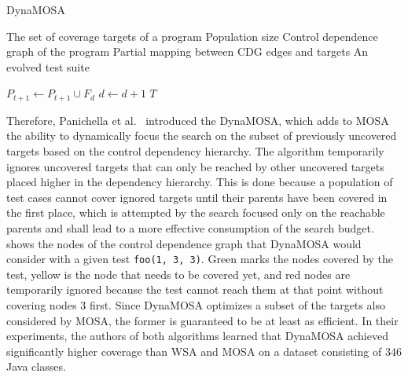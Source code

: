 \documentclass[paper=a4,%
  twoside,%
  BCOR4mm,%
  abstract=true,%
  toc=bibliography,%
  chapterprefix=true,%
  toc=bibliographynumbered,%
  open=right,%
  english,%
  pagesize=pdftex]{scrreprt}
\newcommand{\Desc}[2]{\State \makebox[2em][l]{#1}#2}
\begin{document}
\begin{algorithm}[]
  \caption{DynaMOSA~\cite{Panichella2018}}\label{alg:dynamosa}
  \begin{algorithmic}
  \Input
    \Desc{$U$}{The set of coverage targets of a program}
    \Desc{$M$}{Population size}
    \Desc{$G$}{Control dependence graph of the program}
    \Desc{$\phi$}{Partial mapping between CDG edges and targets}
    \EndInput
    \Output
    \Desc{$T$}{An evolved test suite}
    \EndOutput

          \State $P_{t + 1} \gets P_{t + 1} \cup F_d$
          \State $d \gets d + 1$
      \EndWhile
  \EndWhile
  \State \Return $T$
  \end{algorithmic}
  \end{algorithm}

Therefore, Panichella et al.~\cite{Panichella2018} introduced the \ac{DynaMOSA}, which adds to \ac{MOSA} the ability to dynamically focus the search on the subset of previously uncovered targets based on the control dependency hierarchy. The algorithm temporarily ignores uncovered targets that can only be reached by other uncovered targets placed higher in the dependency hierarchy. This is done because a population of test cases cannot cover ignored targets until their parents have been covered in the first place, which is attempted by the search focused only on the reachable parents and shall lead to a more effective consumption of the search budget.  shows the nodes of the control dependence graph that \ac{DynaMOSA} would consider with a given test \texttt{foo(1, 3, 3)}. Green marks the nodes covered by the test, yellow is the node that needs to be covered yet, and red nodes are temporarily ignored because the test cannot reach them at that point without covering nodes 3 first. Since \ac{DynaMOSA} optimizes a subset of the targets also considered by \ac{MOSA}, the former is guaranteed to be at least as efficient. In their experiments, the authors of both algorithms learned that \ac{DynaMOSA} achieved significantly higher coverage than \ac{WSA} and \ac{MOSA} on a dataset consisting of 346 Java classes.
\end{document}
